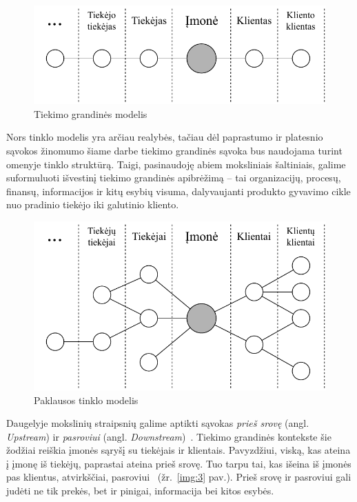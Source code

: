\begin{figure}[H]
    \centering
    \includegraphics[scale=1]{images/client-supplier-model}
    \caption{Tiekimo grandinės modelis~\cite{christopher2016logistics}}
    \label{img:1}
\end{figure}

Nors tinklo modelis yra arčiau realybės, tačiau dėl paprastumo ir platesnio sąvokos žinomumo šiame darbe tiekimo grandinės sąvoka bus naudojama turint omenyje tinklo struktūrą. Taigi, pasinaudoję abiem moksliniais šaltiniais, galime suformuluoti išvestinį tiekimo grandinės apibrėžimą – tai organizacijų, procesų, finansų, informacijos ir kitų esybių visuma, dalyvaujanti produkto gyvavimo cikle nuo pradinio tiekėjo iki galutinio kliento.

\begin{figure}[H]
    \centering
    \includegraphics[scale=0.8]{images/demand-network-model}
    \caption{Paklausos tinklo modelis~\cite{christopher2016logistics}}
    \label{img:2}
\end{figure}

Daugelyje mokslinių straipsnių galime aptikti sąvokas \textit{prieš srovę} (angl. \textit{Upstream}) ir \textit{pasroviui} (angl. \textit{Downstream})~\cite{croson2005upstream, frohlich2001arcs, vachon2006extending}. Tiekimo grandinės kontekste šie žodžiai reiškia įmonės sąryšį su tiekėjais ir klientais. Pavyzdžiui, viską, kas ateina į įmonę iš tiekėjų, paprastai ateina prieš srovę. Tuo tarpu tai, kas išeina iš įmonės pas klientus, atvirkščiai, pasroviui~\cite{christopher2016logistics} (žr.~\ref{img:3} pav.). Prieš srovę ir pasroviui gali judėti ne tik prekės, bet ir pinigai, informacija bei kitos esybės.

